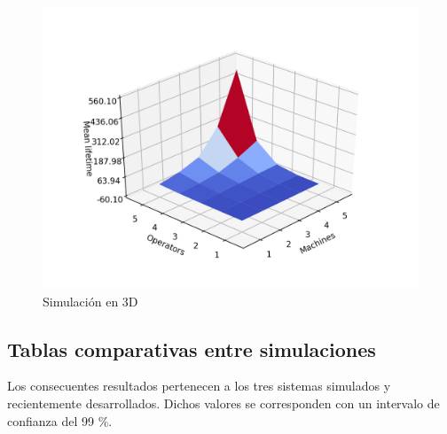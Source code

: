    \begin{figure}[H]
      \includegraphics[scale=1.2]{graphics/Figure_4.png}
      \caption{Simulación en 3D}
      \centering
    \end{figure}

  \pagebreak
  \subsection{Tablas comparativas entre simulaciones}

    \par Los consecuentes resultados pertenecen a los tres sistemas simulados y recientemente desarrollados. Dichos
    valores se corresponden con un intervalo de confianza del 99 \%.

